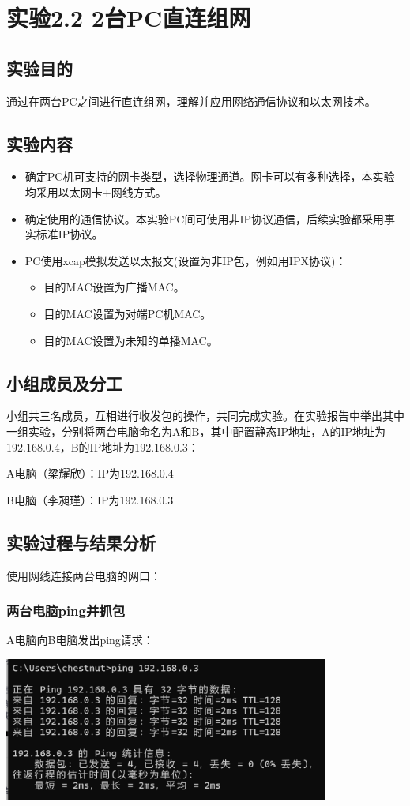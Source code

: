 \documentclass{article}
\begin{document}
\newpage\section{实验2.2 2台PC直连组网}
\subsection{实验目的}
通过在两台PC之间进行直连组网，理解并应用网络通信协议和以太网技术。
\subsection{实验内容}
\begin{itemize}
    \item 确定PC机可支持的网卡类型，选择物理通道。网卡可以有多种选择，本实验均采用以太网卡+网线方式。
    \item 确定使用的通信协议。本实验PC间可使用非IP协议通信，后续实验都采用事实标准IP协议。
    \item PC使用xcap模拟发送以太报文(设置为非IP包，例如用IPX协议)：
        \begin{itemize}
            \item 目的MAC设置为广播MAC。
            \item 目的MAC设置为对端PC机MAC。
            \item 目的MAC设置为未知的单播MAC。
        \end{itemize}
\end{itemize}
\subsection{小组成员及分工}
小组共三名成员，互相进行收发包的操作，共同完成实验。在实验报告中举出其中一组实验，分别将两台电脑命名为A和B，其中配置静态IP地址，A的IP地址为192.168.0.4，B的IP地址为192.168.0.3：

A电脑（梁耀欣）：IP为192.168.0.4

B电脑（李昶瑾）：IP为192.168.0.3
\subsection{实验过程与结果分析}
使用网线连接两台电脑的网口：
\subsubsection{两台电脑ping并抓包}
A电脑向B电脑发出ping请求：
\begin{center}
    \includegraphics[width=0.8\textwidth]{2_2_images/2.png}
\end{center}
\end{document}
